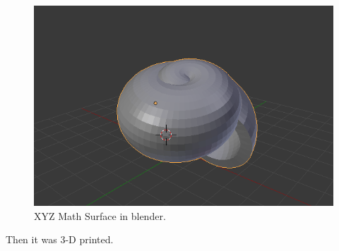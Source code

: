 \documentclass[a4paper]{article}
\begin{document}
\begin{figure}[h]
	\centering\includegraphics[scale=1.7]{./img/modified_torus_blender.png}
	\caption{XYZ Math Surface in blender.}
	\label{blender-modified-torus} %
\end{figure}


Then it was 3-D printed.
\end{document}
